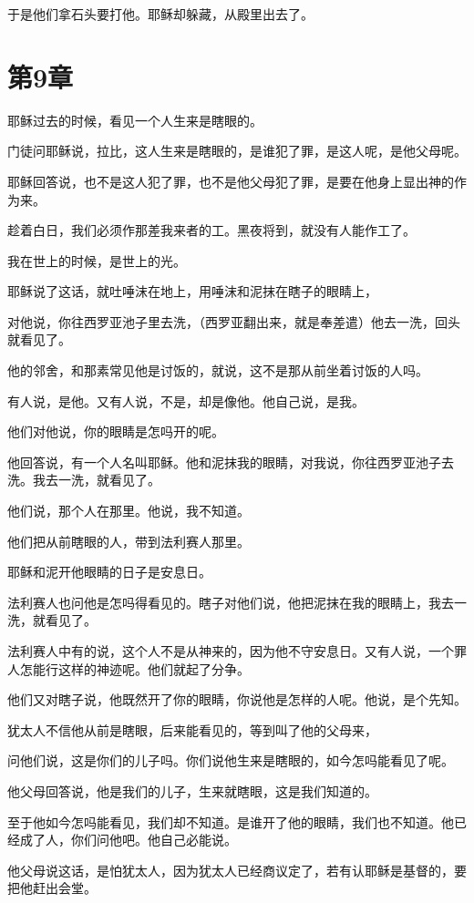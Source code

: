 \documentclass[12pt,oneside]{book}
\begin{document}
于是他们拿石头要打他。耶稣却躲藏，从殿里出去了。

\chapter{第9章}
耶稣过去的时候，看见一个人生来是瞎眼的。

门徒问耶稣说，拉比，这人生来是瞎眼的，是谁犯了罪，是这人呢，是他父母呢。

耶稣回答说，也不是这人犯了罪，也不是他父母犯了罪，是要在他身上显出神的作为来。

趁着白日，我们必须作那差我来者的工。黑夜将到，就没有人能作工了。

我在世上的时候，是世上的光。

耶稣说了这话，就吐唾沫在地上，用唾沫和泥抹在瞎子的眼睛上，

对他说，你往西罗亚池子里去洗，（西罗亚翻出来，就是奉差遣）他去一洗，回头就看见了。

他的邻舍，和那素常见他是讨饭的，就说，这不是那从前坐着讨饭的人吗。

有人说，是他。又有人说，不是，却是像他。他自己说，是我。

他们对他说，你的眼睛是怎吗开的呢。

他回答说，有一个人名叫耶稣。他和泥抹我的眼睛，对我说，你往西罗亚池子去洗。我去一洗，就看见了。

他们说，那个人在那里。他说，我不知道。

他们把从前瞎眼的人，带到法利赛人那里。

耶稣和泥开他眼睛的日子是安息日。

法利赛人也问他是怎吗得看见的。瞎子对他们说，他把泥抹在我的眼睛上，我去一洗，就看见了。

法利赛人中有的说，这个人不是从神来的，因为他不守安息日。又有人说，一个罪人怎能行这样的神迹呢。他们就起了分争。

他们又对瞎子说，他既然开了你的眼睛，你说他是怎样的人呢。他说，是个先知。

犹太人不信他从前是瞎眼，后来能看见的，等到叫了他的父母来，

问他们说，这是你们的儿子吗。你们说他生来是瞎眼的，如今怎吗能看见了呢。

他父母回答说，他是我们的儿子，生来就瞎眼，这是我们知道的。

至于他如今怎吗能看见，我们却不知道。是谁开了他的眼睛，我们也不知道。他已经成了人，你们问他吧。他自己必能说。

他父母说这话，是怕犹太人，因为犹太人已经商议定了，若有认耶稣是基督的，要把他赶出会堂。
\end{document}

